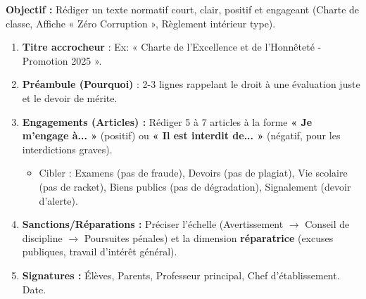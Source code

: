\documentclass[11pt]{article}
\begin{document}
\begin{methode}
    \textbf{Objectif :} Rédiger un texte normatif court, clair, positif et engageant (Charte de classe, Affiche « Zéro Corruption », Règlement intérieur type).
    \begin{enumerate}
        \item \textbf{Titre accrocheur} : Ex: « Charte de l'Excellence et de l'Honnêteté - Promotion 2025 ».
        \item \textbf{Préambule (Pourquoi)} : 2-3 lignes rappelant le droit à une évaluation juste et le devoir de mérite.
        \item \textbf{Engagements (Articles) :} Rédiger 5 à 7 articles à la forme \textbf{« Je m'engage à... »} (positif) ou \textbf{« Il est interdit de... »} (négatif, pour les interdictions graves).
            \begin{itemize}
                \item Cibler : Examens (pas de fraude), Devoirs (pas de plagiat), Vie scolaire (pas de racket), Biens publics (pas de dégradation), Signalement (devoir d'alerte).
            \end{itemize}
        \item \textbf{Sanctions/Réparations :} Préciser l'échelle (Avertissement $\rightarrow$ Conseil de discipline $\rightarrow$ Poursuites pénales) et la dimension \textbf{réparatrice} (excuses publiques, travail d'intérêt général).
        \item \textbf{Signatures :} Élèves, Parents, Professeur principal, Chef d'établissement. Date.
    \end{enumerate}
\end{methode}
\end{document}
